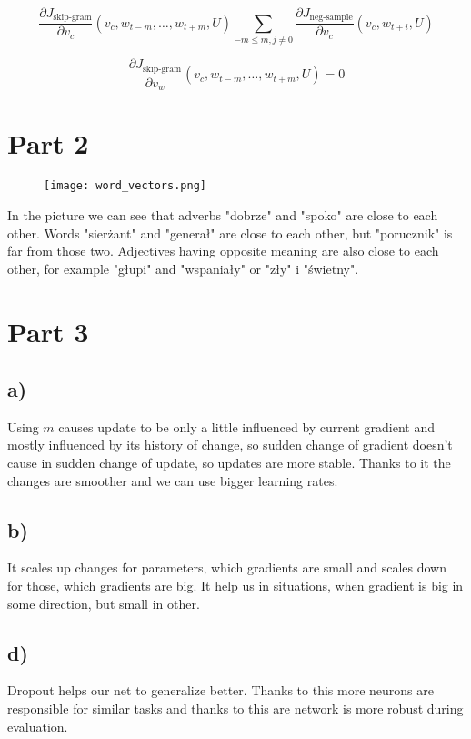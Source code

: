 \documentclass[12pt]{article}
\begin{document}
\[
\frac{\partial J_{\text{skip-gram}}}{\partial v_c} (v_c, w_{t-m}, \ldots, w_{t+m}, U)
\sum_{-m \leq m, j \neq 0} \frac{\partial J_{\text{neg-sample}}}{\partial v_c} (v_c, w_{t+i}, U) 
\]

\[
\frac{\partial J_{\text{skip-gram}}}{\partial v_w} (v_c, w_{t-m}, \ldots, w_{t+m}, U)
= 0
\]

\section{Part 2 }

\begin{figure}[!h]
\centering
\texttt{[image: word\_vectors.png]}
\caption{}
\label{fig:image}
\end{figure}

In the picture we can see that adverbs "dobrze" and "spoko" are close to each other. Words "sierżant" and "generał" are close to each other, but "porucznik" is far from those two. Adjectives having opposite meaning are also close to each other, for example "głupi" and "wspaniały" or "zły" i "świetny".

\section{Part 3 }
\subsection*{a) }

Using $m$ causes update to be only a little influenced by current gradient and mostly influenced by its history of change, so sudden change of gradient doesn't cause in sudden change of update, so updates are more stable. Thanks to it  the changes are smoother and we can use bigger learning rates. 

\subsection*{b) }
It scales up changes for parameters, which gradients are small and scales down for those, which gradients are big. It help us in situations, when gradient is big in some direction, but small in other.
 
\subsection*{d) }
Dropout helps our net to generalize better. Thanks to this more neurons are responsible for similar tasks and thanks to this are network is more robust during evaluation.

 
\end{document}
